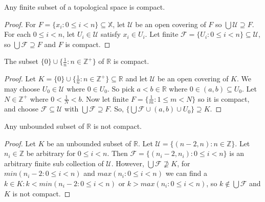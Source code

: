 \documentclass{article}
\begin{document}
	\begin{proposition}
	  Any finite subset of a topological space is compact.
	\end{proposition}

	\begin{proof}
	For $F = \lbrace x_i : 0 \leq i < n \rbrace \subseteq \mathbb{X}$, let $\mathcal{U}$ be an open covering of $F$ so $\bigcup \mathcal{U} \supseteq F$. For each $0 \leq i < n$, let $U_i \in \mathcal{U}$ satisfy $x_i \in U_i$. Let finite $\mathcal{F} = \lbrace U_i : 0 \leq i < n \rbrace \subseteq \mathcal{U}$, so $\bigcup \mathcal{F} \supseteq F$ and $F$ is compact.
	\end{proof}

	\begin{proposition}
	  The subset \(\{0\}\cup\{\frac{1}{n}:n\in\mathbb Z^+\}\) of \(\mathbb R\) is compact.
	\end{proposition}

	\begin{proof}
	Let $K = \lbrace 0 \rbrace \cup \lbrace \frac{1}{n} : n \in \mathbb{Z^+} \rbrace \subseteq \mathbb{R}$ and let $\mathcal{U}$ be an open covering of $K$. We may choose $U_0 \in \mathcal{U}$ where $0 \in U_0$. So pick $a<b \in \mathbb{R}$ where $0 \in (a, b) \subseteq U_0$. Let $N \in \mathbb{Z}^+$ where $0 < \frac{1}{N} < b$. Now let finite $F = \lbrace \frac{1}{m} : 1 \leq m < N \rbrace$ so it is compact, and choose $\mathcal{F} \subseteq \mathcal{U}$ with $\bigcup \mathcal{F} \supseteq F$. So, $\lbrace \bigcup \mathcal{F} \cup (a,b) \cup U_0 \rbrace \supseteq K$.
	\end{proof}

	\begin{proposition}
	  Any unbounded subset of \(\mathbb R\) is not compact.
	\end{proposition}
	\begin{proof}
	Let $K$ be an unbounded subset of $\mathbb{R}$. Let $\mathcal{U} = \lbrace (n-2, n) : n \in \mathbb{Z} \rbrace$. Let $n_i \in \mathbb{Z}$ be arbitrary for $0 \leq i < n$. Then $\mathcal{F} = \lbrace (n_i - 2, n_i) : 0 \leq i < n \rbrace$ is an arbitrary finite sub collection of $\mathcal{U}$. However, $\bigcup \mathcal{F} \not\supseteq K$, for $min(n_i-2: 0 \leq i < n)$ and $max(n_i : 0 \leq i < n)$ we can find a $k \in K : k < min(n_i-2: 0 \leq i < n)$ or $k > max(n_i : 0 \leq i < n)$, so $k  \not\in \bigcup \mathcal{F}$ and $K$ is not compact.
	\end{proof}	
\end{document}
